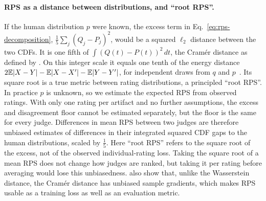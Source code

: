 \paragraph{RPS as a distance between distributions, and ``root RPS''.}
If the human distribution $p$ were known, the excess term in Eq.~\ref{eq:rps-decomposition}, $\frac{1}{5}\sum_j(Q_j-P_j)^2$, would be a squared $\ell_2$ distance between the two CDFs.
It is one fifth of $\int (Q(t)-P(t))^2\,dt$, the Cramér distance as defined by \citet{bellemare2017cramer}.
On this integer scale it equals one tenth of the energy distance $2\mathbb{E}|X-Y|-\mathbb{E}|X-X^{\prime}|-\mathbb{E}|Y-Y^{\prime}|$, for independent draws from $q$ and $p$~\citep{szekely2013energy}.
Its square root is a true metric between rating distributions, a principled ``root RPS''.
In practice $p$ is unknown, so we estimate the expected RPS from observed ratings.
With only one rating per artifact and no further assumptions, the excess and disagreement floor cannot be estimated separately, but the floor is the same for every judge.
Differences in mean RPS between two judges are therefore unbiased estimates of differences in their integrated squared CDF gaps to the human distributions, scaled by $\frac{1}{5}$.
Here ``root RPS'' refers to the square root of the excess, not of the observed individual-rating loss.
Taking the square root of a mean RPS does not change how judges are ranked, but taking it per rating before averaging would lose this unbiasedness.
\citet{bellemare2017cramer} also show that, unlike the Wasserstein distance, the Cramér distance has unbiased sample gradients, which makes RPS usable as a training loss as well as an evaluation metric.

